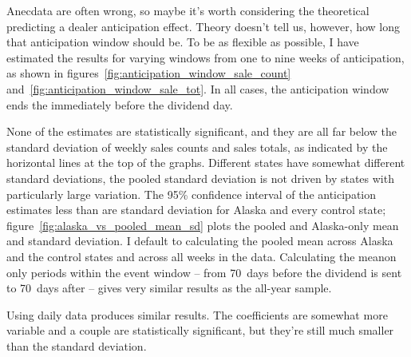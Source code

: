 \documentclass[11pt,letterpaper,oneside]{article}
\newcommand{\snippet}[1]{\hspace{-0.15em}}
\begin{document}
\begin{doublespacing}
%


Anecdata are often wrong, so maybe it's worth considering the theoretical predicting a dealer anticipation effect.
Theory doesn't tell us, however, how long that anticipation window should be.
To be as flexible as possible, I have estimated the results for varying windows from one to nine weeks of anticipation, as shown in figures~\ref{fig:anticipation_window_sale_count} and~\ref{fig:anticipation_window_sale_tot}.
In all cases, the anticipation window ends the immediately before the dividend day.

None of the estimates are statistically significant, and they are all far below the standard deviation of weekly sales counts and sales totals, as indicated by the horizontal lines at the top of the graphs.
Different states have somewhat different standard deviations, the pooled standard deviation is not driven by states with particularly large variation.
The 95\% confidence interval of the anticipation estimates less than are standard deviation for Alaska and every control state; figure~\ref{fig:alaska_vs_pooled_mean_sd} plots the pooled and Alaska\hyp{}only mean and standard deviation.
I default to calculating the pooled mean across Alaska and the control states and across all weeks in the data.
Calculating the meanon only periods within the event window -- from 70~days before the dividend is sent to 70~days after -- gives very similar results as the all\hyp{}year sample.

Using daily data produces similar results.
The coefficients are somewhat more variable and a couple are statistically significant, but they're still much smaller than the standard deviation.



\end{doublespacing}
\end{document}
